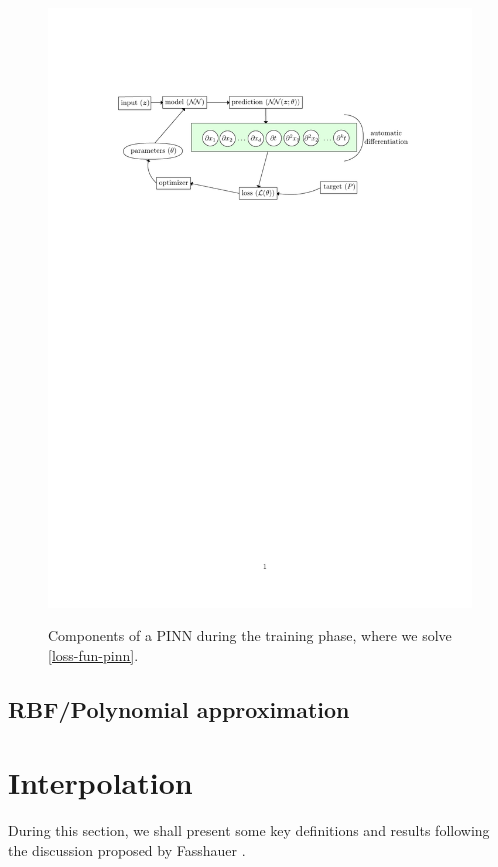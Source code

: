 \documentclass[12pt]{report} %
\begin{document}
\begin{figure}[ht]
    \centering
    {\includegraphics[width=\textwidth, clip=true, trim={3cm 20cm 3cm 4cm}]{imagenes/autodiffgraph.pdf}}
    \caption{Components of a PINN during the training phase, where we solve \eqref{loss-fun-pinn}. 
    }\label{fig:autodiffgraph}
\end{figure}

\section{RBF/Polynomial approximation}

\chapter{Interpolation}

During this section, we shall present some key definitions and results
following the discussion proposed by Fasshauer \cite{fasshauer2007meshfree}.
\end{document}
